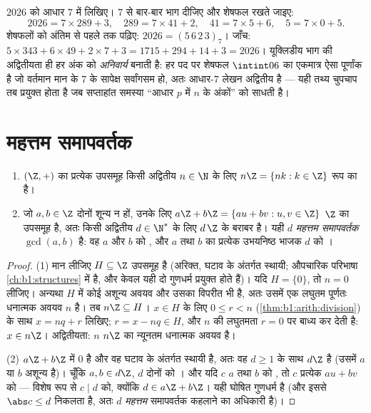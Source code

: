 \begin{example}[बार-बार भाग देकर स्थानीय मान पद्धति]\label{ex:b1:arith:base7}
$2026$ को आधार $7$ में लिखिए। $7$ से बार-बार भाग दीजिए और शेषफल रखते जाइए:
\[
2026 = 7 \times 289 + 3, \quad
289 = 7 \times 41 + 2, \quad
41 = 7 \times 5 + 6, \quad
5 = 7 \times 0 + 5 .
\]
शेषफलों को अंतिम से पहले तक पढ़िए: $2026 = (5\,6\,2\,3)_7$। जाँच: $5 \times
343 + 6 \times 49 + 2 \times 7 + 3 = 1715 + 294 + 14 + 3 = 2026$। यूक्लिडीय
भाग की अद्वितीयता ही हर अंक को \emph{अनिवार्य} बनाती है: हर पद पर शेषफल
$\intint06$ का एकमात्र ऐसा पूर्णांक है जो वर्तमान मान के $7$ के सापेक्ष
सर्वांगसम हो, अतः आधार-$7$ लेखन अद्वितीय है --- यही तथ्य चुपचाप तब प्रयुक्त
होता है जब सप्ताहांत समस्या ``आधार $p$ में $n$ के अंकों'' को साधती है।
\end{example}

\section{महत्तम समापवर्तक}

\begin{theorem}\label{thm:b1:arith:gcd}
\begin{enumerate}
  \item $(\Z, +)$ का प्रत्येक उपसमूह किसी अद्वितीय $n \in \N$ के लिए $n\Z =
  \{nk : k \in \Z\}$ रूप का है।
  \item जो $a, b \in \Z$ दोनों शून्य न हों, उनके लिए  $a\Z + b\Z =
  \{au + bv : u, v \in \Z\}$ $\Z$ का उपसमूह है, अतः किसी अद्वितीय $d \in
  \N^*$ के लिए $d\,\Z$ के बराबर है। यही $d$ \emph{महत्तम
  समापवर्तक} $\gcd(a, b)$ है: वह $a$ और $b$ को
  , और $a$ तथा $b$ का प्रत्येक उभयनिष्ठ भाजक $d$ को ।
\end{enumerate}
\end{theorem}

\begin{proof}
(1) मान लीजिए $H \subseteq \Z$ उपसमूह है (अरिक्त, घटाव के अंतर्गत स्थायी;
औपचारिक परिभाषा \cref{ch:b1:structures} में है, और केवल यही दो गुणधर्म
प्रयुक्त होते हैं)। यदि $H = \{0\}$, तो $n = 0$ लीजिए। अन्यथा $H$ में कोई
अशून्य अवयव और उसका विपरीत भी है, अतः उसमें एक लघुतम पूर्णतः धनात्मक अवयव
$n$ है। तब $n\Z \subseteq H$। $x \in H$ के लिए $0 \leq r < n$
(\cref{thm:b1:arith:division}) के साथ $x = nq + r$ लिखिए; $r = x - nq \in
H$, और $n$ की लघुतमता $r = 0$ पर बाध्य कर देती है: $x \in n\Z$। अद्वितीयता:
$n$ $n\Z$ का न्यूनतम धनात्मक अवयव है।

(2) $a\Z + b\Z$ में $0$ है और वह घटाव के अंतर्गत स्थायी है, अतः वह $d \geq
1$ के साथ $d\Z$ है (उसमें $a$ या $b$ अशून्य है)। चूँकि $a, b \in d\Z$, $d$
दोनों को । और यदि $c$ $a$ तथा $b$ को , तो $c$
प्रत्येक $au + bv$ को  --- विशेष रूप से $c \mid d$ को,
क्योंकि $d \in a\Z + b\Z$। यही घोषित गुणधर्म है (और इससे $\abs c \leq d$
निकलता है, अतः $d$ \emph{महत्तम} समापवर्तक कहलाने का अधिकारी है)।
\end{proof}

